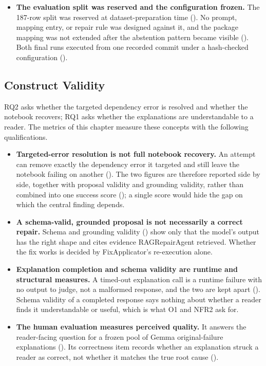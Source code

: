 \begin{itemize}
    visible. They nevertheless remain unresolved cases in the 73-attempt
    targeted-resolution denominator, so this classification does not
    inflate the reported 62/73 resolution rate.
  \item \textbf{The evaluation split was reserved and the configuration
    frozen.} The 187-row split was reserved at dataset-preparation time
    (). No prompt, mapping entry, or repair rule was
    designed against it, and the package mapping was not extended after
    the abstention pattern became visible (). Both
    final runs executed from one recorded commit under a hash-checked
    configuration ().
\end{itemize}

\subsection{Construct Validity}
\label{sec:v-threats-construct}

RQ2 asks whether the targeted dependency error is resolved and whether
the notebook recovers; RQ1 asks whether the explanations are
understandable to a reader. The metrics of this chapter measure these
concepts with the following qualifications.

\begin{itemize}
  \item \textbf{Targeted-error resolution is not full notebook recovery.}
    An attempt can remove exactly the dependency error it targeted and
    still leave the notebook failing on another
    (). The two figures are
    therefore reported side by side, together with proposal validity and
    grounding validity, rather than combined into one success score
    (); a single score would hide the gap on which
    the central finding depends.
  \item \textbf{A schema-valid, grounded proposal is not necessarily a
    correct repair.} Schema and grounding validity
    () show only that the model's output has the
    right shape and cites evidence RAGRepairAgent retrieved. Whether the
    fix works is decided by FixApplicator's re-execution alone.
  \item \textbf{Explanation completion and schema validity are runtime and
    structural measures.} A timed-out explanation call is a runtime failure
    with no output to judge, not a malformed response, and the two are kept
    apart (). Schema validity of a completed
    response says nothing about whether a reader finds it understandable
    or useful, which is what O1 and NFR2 ask for.
  \item \textbf{The human evaluation measures perceived quality.} It
    answers the reader-facing question for a frozen pool of Gemma
    original-failure explanations (). Its
    correctness item records whether an explanation struck a reader as
    correct, not whether it matches the true root cause
    ().
\end{itemize}

